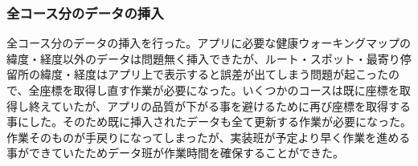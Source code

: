 ﻿\subsubsection{全コース分のデータの挿入}
全コース分のデータの挿入を行った。アプリに必要な健康ウォーキングマップの緯度・経度以外のデータは問題無く挿入できたが、ルート・スポット・最寄り停留所の緯度・経度はアプリ上で表示すると誤差が出てしまう問題が起こったので、全座標を取得し直す作業が必要になった。いくつかのコースは既に座標を取得し終えていたが、アプリの品質が下がる事を避けるために再び座標を取得する事にした。そのため既に挿入されたデータも全て更新する作業が必要になった。作業そのものが手戻りになってしまったが、実装班が予定より早く作業を進める事ができていたためデータ班が作業時間を確保することができた。


